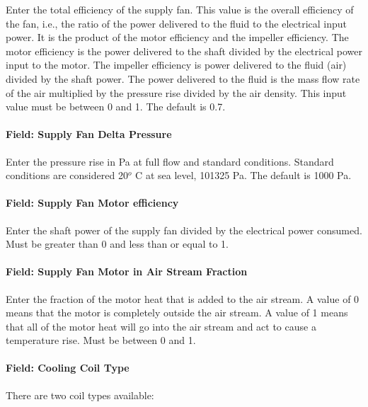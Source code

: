 Enter the total efficiency of the supply fan. This value is the overall efficiency of the fan, i.e., the ratio of the power delivered to the fluid to the electrical input power. It is the product of the motor efficiency and the impeller efficiency. The motor efficiency is the power delivered to the shaft divided by the electrical power input to the motor. The impeller efficiency is power delivered to the fluid (air) divided by the shaft power. The power delivered to the fluid is the mass flow rate of the air multiplied by the pressure rise divided by the air density. This input value must be between 0 and 1. The default is 0.7.

\paragraph{Field: Supply Fan Delta Pressure}\label{field-supply-fan-delta-pressure-7}

Enter the pressure rise in Pa at full flow and standard conditions. Standard conditions are considered 20\(^{o}\) C at sea level, 101325 Pa. The default is 1000 Pa.

\paragraph{Field: Supply Fan Motor efficiency}\label{field-supply-fan-motor-efficiency-8}

Enter the shaft power of the supply fan divided by the electrical power consumed. Must be greater than 0 and less than or equal to 1.

\paragraph{Field: Supply Fan Motor in Air Stream Fraction}\label{field-supply-fan-motor-in-air-stream-fraction-4}

Enter the fraction of the motor heat that is added to the air stream. A value of 0 means that the motor is completely outside the air stream. A value of 1 means that all of the motor heat will go into the air stream and act to cause a temperature rise. Must be between 0 and 1.

\paragraph{Field: Cooling Coil Type}\label{field-cooling-coil-type-8}

There are two coil types available:

